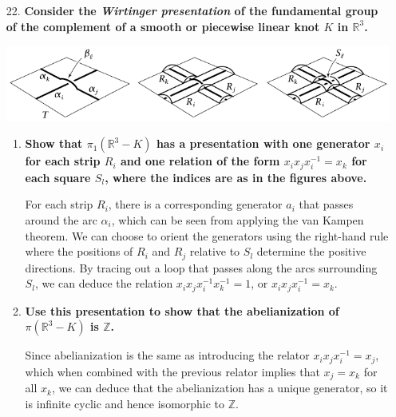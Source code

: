 \documentclass[a4paper,12pt]{article}
\begin{document}
\begin{enumerate}
    \item[22.]
        \boldmath\textbf{Consider the \emph{Wirtinger presentation} of the fundamental group of the complement of a smooth or piecewise linear knot $K$ in $\mathbb{R}^3$.
        }\unboldmath \par
        \includegraphics[scale=0.75]{hw3_22} \par
        \begin{enumerate}[label=(\alph*)]
            \item
                \boldmath\textbf{Show that $\pi_1(\mathbb{R}^3 - K)$ has a presentation with one generator $x_i$ for each strip $R_i$ and one relation of the form $x_i x_j x_i^{-1} = x_k$ for each square $S_l$, where the indices are as in the figures above.
                }\unboldmath \par
                For each strip $R_i$, there is a corresponding generator $a_i$ that passes around the arc $\alpha_i$, which can be seen from applying the van Kampen theorem. We can choose to orient the generators using the right-hand rule where the positions of $R_i$ and $R_j$ relative to $S_l$ determine the positive directions. By tracing out a loop that passes along the arcs surrounding $S_l$, we can deduce the relation $x_i x_j x_i^{-1} x_k^{-1} = 1$, or $x_i x_j x_i^{-1} = x_k$.

            \item
                \boldmath\textbf{Use this presentation to show that the abelianization of $\pi(\mathbb{R}^3 - K)$ is $\mathbb{Z}$.
                }\unboldmath \par
                Since abelianization is the same as introducing the relator $x_i x_j x_i^{-1} = x_j$, which when combined with the previous relator implies that $x_j = x_k$ for all $x_k$, we can deduce that the abelianization has a unique generator, so it is infinite cyclic and hence isomorphic to $\mathbb{Z}$.
        \end{enumerate}
\end{enumerate}
\end{document}
